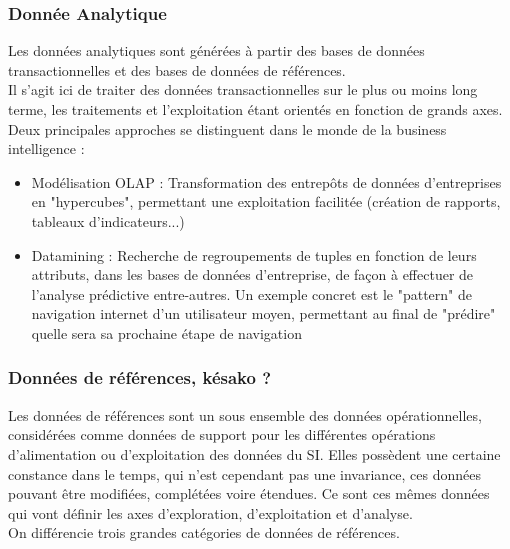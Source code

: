 \subsubsection{Donnée Analytique}

Les données analytiques sont générées à partir des bases de données transactionnelles et des bases de données de références.\\
Il s'agit ici de traiter des données transactionnelles sur le plus ou moins long terme, les traitements et l'exploitation étant orientés en fonction de grands axes.\\
Deux principales approches se distinguent dans le monde de la business intelligence :
\begin{itemize}
\item Modélisation OLAP : Transformation des entrepôts de données d'entreprises en "hypercubes", permettant une exploitation facilitée (création de rapports, tableaux d'indicateurs...)
\item Datamining : Recherche de regroupements de tuples en fonction de leurs attributs, dans les bases de données d'entreprise, de façon à effectuer de l'analyse prédictive entre-autres. Un exemple concret est le "pattern" de navigation internet d'un utilisateur moyen, permettant au final de "prédire" quelle sera sa prochaine étape de navigation
\end{itemize}

\subsubsection{Données de références, késako ? }

Les données de références sont un sous ensemble des données opérationnelles, considérées comme données de support pour les différentes opérations d'alimentation ou d'exploitation des données du SI. Elles possèdent une certaine constance dans le temps, qui n'est cependant pas une invariance, ces données pouvant être modifiées, complétées voire étendues. Ce sont ces mêmes données qui vont définir les axes d'exploration, d'exploitation et d'analyse.\\
On différencie trois grandes catégories de données de références.

